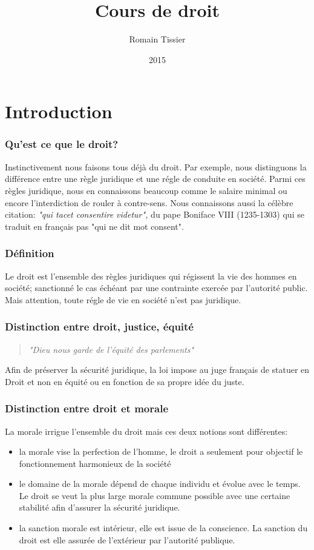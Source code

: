 \documentclass[a4paper]{article}
\title{Cours de droit}
\author{Romain Tissier}
\date{2015}
\begin{document}
	\maketitle
	\newpage
	\tableofcontents
	\newpage
	\part{Introduction}
		\section{Qu'est ce que le droit?}
			Instinctivement nous faisons tous déjà du droit. Par exemple, nous distinguons la différence entre une règle juridique et une régle de conduite en société. Parmi ces règles juridique, nous en connaissons beaucoup comme le salaire minimal ou encore l'interdiction de rouler à contre-sens. Nous connaissons aussi la célèbre citation: \textit{"qui tacet consentire videtur",} du pape Boniface VIII (1235-1303) qui se traduit en français pas "qui ne dit mot consent".
		\section{Définition}
			Le droit est l'ensemble des règles juridiques qui régissent la vie des hommes en société; sanctionné le cas échéant par une contrainte exercée par l'autorité public. Mais attention, toute régle de vie en société n'est pas juridique. 
		\section{Distinction entre droit, justice, équité}
			\begin{quote}
				\textit{"Dieu nous garde de l'équité des parlements"}
			\end{quote}
			Afin de préserver la sécurité juridique, la loi impose au juge français de statuer en Droit et non en équité ou en fonction de sa propre idée du juste. 
		\section{Distinction entre droit et morale}
			La morale irrigue l'ensemble du droit mais ces deux notions sont différentes: 
			\begin{itemize}
				\item la morale vise la perfection de l'homme, le droit a seulement pour objectif le fonctionnement harmonieux de la société
				\item le domaine de la morale dépend de chaque individu et évolue avec le temps. Le droit se veut la plus large morale commune possible avec une certaine stabilité afin d'assurer la sécurité juridique. 
				\item la sanction morale est intérieur, elle est issue de la conscience. La sanction du droit est elle assurée de l'extérieur par l'autorité publique. 
			\end{itemize}
\end{document}
